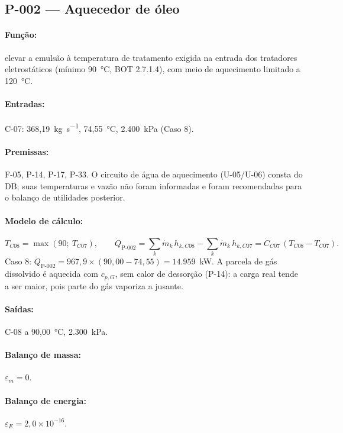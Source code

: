 \documentclass[11pt,a4paper]{article}
\numberwithin{equation}{section}
\numberwithin{table}{section}
\numberwithin{figure}{section}
\begin{document}
\subsection{P-002 --- Aquecedor de óleo}
\paragraph{Função:} elevar a emulsão à temperatura de tratamento exigida na entrada dos tratadores eletrostáticos (mínimo 90~\si{\celsius}, BOT 2.7.1.4), com meio de aquecimento limitado a 120~\si{\celsius}.
\paragraph{Entradas:} C-07: 368,19~\si{\kilogram\per\second}, 74,55~\si{\celsius}, 2.400~\si{\kilo\pascal} (Caso 8).
\paragraph{Premissas:} F-05, P-14, P-17, P-33. O circuito de água de aquecimento (U-05/U-06) consta do DB; suas temperaturas e vazão não foram informadas e foram recomendadas para o balanço de utilidades posterior.
\paragraph{Modelo de cálculo:}
\begin{equation}\label{eq:heater}
T_{C08}=\max(90;\ T_{C07}),\qquad \dot Q_{\mbox{P-002}}=\sum_k\dot m_k\,h_{k,C08}-\sum_k\dot m_k\,h_{k,C07}=\dot C_{C07}\,(T_{C08}-T_{C07}).
\end{equation}
Caso 8: $\dot Q_{\mbox{P-002}}=967{,}9\times(90{,}00-74{,}55)=14.959$~\si{\kilo\watt}. A parcela de gás dissolvido é aquecida com $c_{p,G}$, sem calor de dessorção (P-14): a carga real tende a ser maior, pois parte do gás vaporiza a jusante.

\paragraph{Saídas:} C-08 a 90,00~\si{\celsius}, 2.300~\si{\kilo\pascal}.
\paragraph{Balanço de massa:} $\varepsilon_m=$$0$.
\paragraph{Balanço de energia:} $\varepsilon_E=$$2{,}0\times10^{-16}$.
\end{document}
